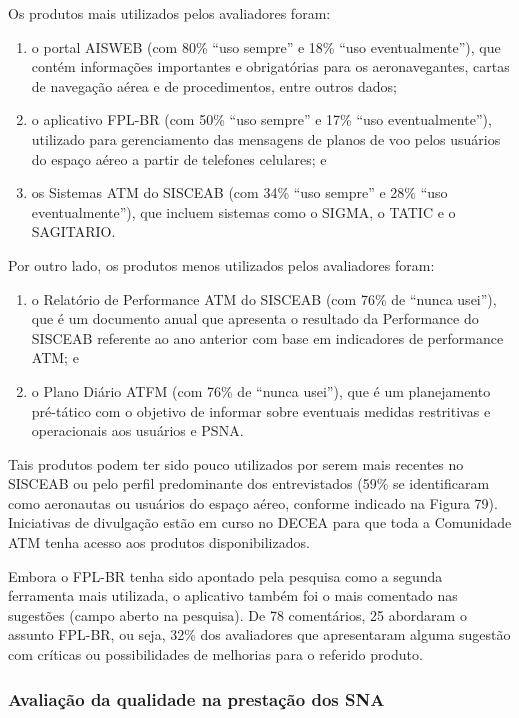 \documentclass[
]{book}
\begin{document}
Os produtos mais utilizados pelos avaliadores foram:

\begin{enumerate}
\def\labelenumi{\alph{enumi})}
\item
  o portal AISWEB (com 80\% ``uso sempre'' e 18\% ``uso eventualmente''), que contém informações importantes e obrigatórias para os aeronavegantes, cartas de navegação aérea e de procedimentos, entre outros dados;
\item
  o aplicativo FPL-BR (com 50\% ``uso sempre'' e 17\% ``uso eventualmente''), utilizado para gerenciamento das mensagens de planos de voo pelos usuários do espaço aéreo a partir de telefones celulares; e
\item
  os Sistemas ATM do SISCEAB (com 34\% ``uso sempre'' e 28\% ``uso eventualmente''), que incluem sistemas como o SIGMA, o TATIC e o SAGITARIO.
\end{enumerate}

Por outro lado, os produtos menos utilizados pelos avaliadores foram:

\begin{enumerate}
\def\labelenumi{\alph{enumi})}
\item
  o Relatório de Performance ATM do SISCEAB (com 76\% de ``nunca usei''), que é um documento anual que apresenta o resultado da Performance do SISCEAB referente ao ano anterior com base em indicadores de performance ATM; e
\item
  o Plano Diário ATFM (com 76\% de ``nunca usei''), que é um planejamento pré-tático com o objetivo de informar sobre eventuais medidas restritivas e operacionais aos usuários e PSNA.
\end{enumerate}

Tais produtos podem ter sido pouco utilizados por serem mais recentes no SISCEAB ou pelo perfil predominante dos entrevistados (59\% se identificaram como aeronautas ou usuários do espaço aéreo, conforme indicado na Figura 79). Iniciativas de divulgação estão em curso no DECEA para que toda a Comunidade ATM tenha acesso aos produtos disponibilizados.

Embora o FPL-BR tenha sido apontado pela pesquisa como a segunda ferramenta mais utilizada, o aplicativo também foi o mais comentado nas sugestões (campo aberto na pesquisa). De 78 comentários, 25 abordaram o assunto FPL-BR, ou seja, 32\% dos avaliadores que apresentaram alguma sugestão com críticas ou possibilidades de melhorias para o referido produto.

\hypertarget{avaliauxe7uxe3o-da-qualidade-na-prestauxe7uxe3o-dos-sna}{%
\subsubsection{Avaliação da qualidade na prestação dos SNA}\label{avaliauxe7uxe3o-da-qualidade-na-prestauxe7uxe3o-dos-sna}}
\end{document}
